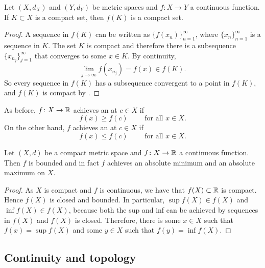 \begin{lemma} \label{lemma:continuouscompact}
Let $(X,d_X)$ and $(Y,d_Y)$ be metric spaces
and $f \colon X \to Y$ a continuous function.  If
$K \subset X$ is a compact set, then $f(K)$ is a compact set.
\end{lemma}

\begin{proof}
A sequence in $f(K)$ can be written as
$\{ f(x_n) \}_{n=1}^\infty$, where
$\{ x_n \}_{n=1}^\infty$ is a sequence in $K$.  The set $K$ is compact and
therefore there is a subsequence
$\{ x_{n_j} \}_{j=1}^\infty$ that converges to some $x \in K$.
By continuity,
\begin{equation*}
\lim_{j\to\infty} f(x_{n_j}) = f(x) \in f(K) .
\end{equation*}
So every sequence in $f(K)$ has a subsequence convergent to 
a point in $f(K)$, and $f(K)$ is compact by .
\end{proof}

As before, $f \colon X \to {\mathbb{R}}$ achieves an
\emph{} at $c \in X$ if
\begin{equation*}
f(x) \geq f(c) \qquad \text{ for all $x \in X$.}
\end{equation*}
On the other hand, $f$ achieves an 
\emph{} at $c \in X$ if
\begin{equation*}
f(x) \leq f(c) \qquad \text{ for all $x \in X$.}
\end{equation*}

\begin{thm}
Let $(X,d)$ be a compact metric space
and $f \colon X \to {\mathbb{R}}$ a continuous function.  Then
$f$ is bounded and in fact
$f$ achieves an absolute minimum and an absolute maximum on $X$.
\end{thm}

\begin{proof}
As $X$ is compact and $f$ is continuous, we have
that $f(X) \subset {\mathbb{R}}$ is compact.  Hence $f(X)$ is closed
and bounded.  In particular,
$\sup f(X) \in f(X)$ and
$\inf f(X) \in f(X)$, because both the sup and inf
can be achieved by sequences in $f(X)$ and $f(X)$ is closed.
Therefore, there is some $x \in X$ such that $f(x) = \sup f(X)$
and some $y \in X$ such that $f(y) = \inf f(X)$.
\end{proof}

\subsection{Continuity and topology}


